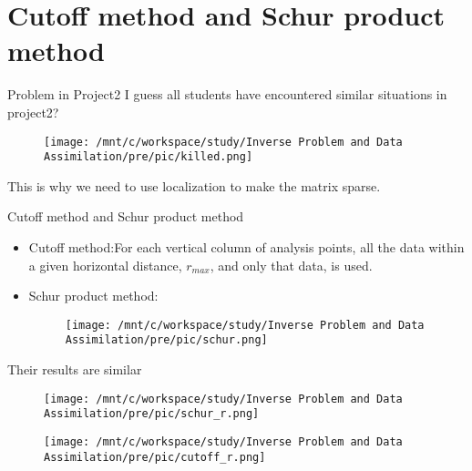\documentclass{beamer}
\begin{document}
\section{Cutoff method and Schur product method}
\begin{frame}{Problem in Project2}
    I guess all students have encountered similar situations in project2?
    \begin{figure}[htbp]
        \centering
            \texttt{[image: /mnt/c/workspace/study/Inverse Problem and Data Assimilation/pre/pic/killed.png]} %
    \end{figure}

    This is why we need to use localization to make the matrix sparse.
\end{frame}
\begin{frame}{Cutoff method and Schur product method}
    \begin{itemize}
        \item Cutoff method:For
        each vertical column of analysis points, all the data
        within a given horizontal distance, $r_{max}$, and only that
        data, is used.
        \item Schur product method:\begin{figure}[htbp]
            \centering
                \texttt{[image: /mnt/c/workspace/study/Inverse Problem and Data Assimilation/pre/pic/schur.png]} %
        \end{figure}
    \end{itemize}
\end{frame}
\begin{frame}{Their results are similar}
    \begin{figure}[htbp]
        \centering
        \begin{minipage}[t]{0.48\textwidth}
            \centering
            \texttt{[image: /mnt/c/workspace/study/Inverse Problem and Data Assimilation/pre/pic/schur\_r.png]}
        \end{minipage}
        \hfill
        \begin{minipage}[t]{0.48\textwidth}
            \centering
            \texttt{[image: /mnt/c/workspace/study/Inverse Problem and Data Assimilation/pre/pic/cutoff\_r.png]} %

        \end{minipage}
    \end{figure}
\end{frame}
\end{document}

